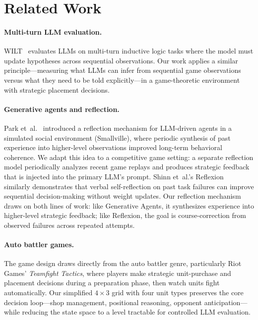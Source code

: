 \documentclass[11pt]{article}
\begin{document}
\section{Related Work}\label{sec:related}

\paragraph{Multi-turn LLM evaluation.}
WILT~\cite{wilt2025} evaluates LLMs on multi-turn inductive logic tasks where the model must update hypotheses across sequential observations.
Our work applies a similar principle---measuring what LLMs can infer from sequential game observations versus what they need to be told explicitly---in a game-theoretic environment with strategic placement decisions.

\paragraph{Generative agents and reflection.}
Park et~al.~\cite{park2023generative} introduced a reflection mechanism for LLM-driven agents in a simulated social environment (Smallville), where periodic synthesis of past experience into higher-level observations improved long-term behavioral coherence.
We adapt this idea to a competitive game setting: a separate reflection model periodically analyzes recent game replays and produces strategic feedback that is injected into the primary LLM's prompt.
Shinn et~al.'s Reflexion~\cite{shinn2023reflexion} similarly demonstrates that verbal self-reflection on past task failures can improve sequential decision-making without weight updates.
Our reflection mechanism draws on both lines of work: like Generative Agents, it synthesizes experience into higher-level strategic feedback; like Reflexion, the goal is course-correction from observed failures across repeated attempts.

\paragraph{Auto battler games.}
The game design draws directly from the auto battler genre, particularly Riot Games' \emph{Teamfight Tactics}, where players make strategic unit-purchase and placement decisions during a preparation phase, then watch units fight automatically.
Our simplified $4 \times 3$ grid with four unit types preserves the core decision loop---shop management, positional reasoning, opponent anticipation---while reducing the state space to a level tractable for controlled LLM evaluation.
\end{document}
